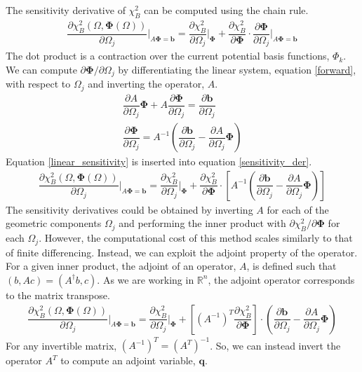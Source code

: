 \documentclass[aps,unsortedaddress]{revtex4-1}
\newcommand{\partder}[2]{\dfrac{\partial  #1}{\partial  #2}}
\begin{document}
The sensitivity derivative of $\chi^2_B$ can be computed using the chain rule. 
\begin{gather}
\partder{\chi^2_B(\Omega, \bm{\Phi}(\Omega))}{\Omega_j} \bigg \rvert_{A \bm{\Phi} = \bm{b}} = \partder{\chi^2_B}{\Omega_j} \bigg \rvert_{\bm{\Phi}} + \partder{\chi^2_B}{\bm{\Phi}} \cdot \partder{\bm{\Phi}}{\Omega_j} \bigg \rvert_{A \bm{\Phi} = \bm{b}}
\label{sensitivity_der}
\end{gather}
The dot product is a contraction over the current potential basis functions, $\Phi_k$. We can compute $\partial \bm{\Phi}/ \partial \Omega_j$ by differentiating the linear system, equation \ref{forward}, with respect to $\Omega_j$ and inverting the operator, $A$.
\begin{gather}
\partder{A}{\Omega_j} \bm{\Phi} + A \partder{\bm{\Phi}}{\Omega_j} = \partder{\bm{b}}{\Omega_j} \\
\partder{\bm{\Phi}}{\Omega_j} = A^{-1} \left( \partder{\bm{b}}{\Omega_j} - \partder{A}{\Omega_j} \bm{\Phi} \right) 
\label{linear_sensitivity}
\end{gather}
Equation \ref{linear_sensitivity} is inserted into equation \ref{sensitivity_der}.
\begin{gather}
\partder{\chi^2_B(\Omega, \bm{\Phi}(\Omega))}{\Omega_j} \bigg \rvert_{A \bm{\Phi} = \bm{b}} = \partder{\chi^2_B}{\Omega_j} \bigg \rvert_{\bm{\Phi}} + \partder{\chi^2_B}{\bm{\Phi}} \cdot \left[ A^{-1} \left( \partder{\bm{b}}{\Omega_j} - \partder{A}{\Omega_j} \bm{\Phi} \right) \right] 
\end{gather}
The sensitivity derivatives could be obtained by inverting $A$ for each of the geometric components $\Omega_j$ and performing the inner product with $\partial \chi^2_B/ \partial \bm{\Phi}$ for each $\Omega_j$. However, the computational cost of this method scales similarly to that of finite differencing. Instead, we can exploit the adjoint property of the operator. For a given inner product, the adjoint of an operator, $A$, is defined such that $(b,Ac) = (A^{\dagger} b, c)$. As we are working in $\mathbb{R}^n$, the adjoint operator corresponds to the matrix transpose. 
\begin{gather}
\partder{\chi^2_B(\Omega, \bm{\Phi}(\Omega))}{\Omega_j} \bigg \rvert_{A \bm{\Phi} = \bm{b}} = \partder{\chi^2_B}{\Omega_j} \bigg \rvert_{\bm{\Phi}} + \left[ \left(A^{-1}\right)^{T} \partder{\chi^2_B}{\bm{\Phi}}\right] \cdot \left( \partder{\bm{b}}{\Omega_j} - \partder{A}{\Omega_j} \bm{\Phi} \right)
\end{gather}
For any invertible matrix, $\left( A^{-1} \right)^T = \left( A^{T} \right)^{-1}$. So, we can instead invert the operator $A^T$ to compute an adjoint variable, $\bm{q}$.
\end{document}
